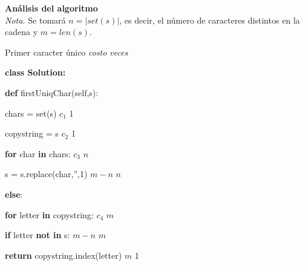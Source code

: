 \documentclass{article}
\begin{document}
\textbf{Análisis del algoritmo} \\
\textit{Nota.} Se tomará $n=|set(s)|$, es decir, el número de caracteres distintos en la cadena y $m = len(s)$. \\
\begin{algorithm}
\caption{Primer caracter único \hspace{3.5cm} \textit{costo} \hspace{0.5cm} \textit{veces}}\label{Primer algoritmo}
\begin{algorithmic}
\item \textbf{class Solution:} 
    \item \hspace{0.3cm} \textbf{def} firstUniqChar(self,s): 
    \item \hspace{0.7cm} chars = set(s) \hspace{6.1cm} $c_1$ \hspace{1.1cm} 1
    \item \hspace{0.7cm} copystring = s \hspace{6cm} $c_2$ \hspace{1.1cm} 1
    \item  \hspace{0.7cm} \textbf{for} char \textbf{in} chars: \hspace{5.5cm} $c_3$ \hspace{1.1cm} $n$
            \item \hspace{1.3cm} s = s.replace(char,'',1) \hspace{3.9cm} $m-n$ \hspace{0.8cm} $n$
        \item \hspace{0.7cm} \textbf{else}:
            \item \hspace{1.3cm} \textbf{for} letter \textbf{in} copystring: \hspace{4cm} $c_4$ \hspace{1.1cm} $m$
                \item \hspace{1.6cm} \textbf{if} letter \textbf{not in} s: \hspace{4.4cm} $m-n$ \hspace{0.7cm} $m$
                    \item \hspace{1.9cm} \textbf{return} copystring.index(letter) \hspace{2.3cm} $m$ \hspace{1.1cm} 1

\end{algorithmic}
\end{algorithm}
\end{document}
